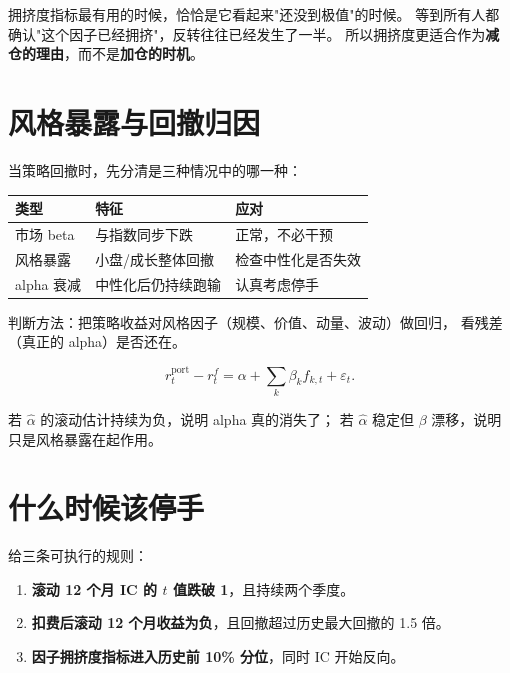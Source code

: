 \begin{warnbox}[拥挤度的悖论]
拥挤度指标最有用的时候，恰恰是它看起来"还没到极值"的时候。
等到所有人都确认"这个因子已经拥挤"，反转往往已经发生了一半。
所以拥挤度更适合作为\textbf{减仓的理由}，而不是\textbf{加仓的时机}。
\end{warnbox}

\section{风格暴露与回撤归因}

当策略回撤时，先分清是三种情况中的哪一种：

\begin{center}
\begin{tabular}{@{}lll@{}}
\toprule
类型 & 特征 & 应对 \\
\midrule
市场 beta & 与指数同步下跌 & 正常，不必干预 \\
风格暴露 & 小盘/成长整体回撤 & 检查中性化是否失效 \\
alpha 衰减 & 中性化后仍持续跑输 & 认真考虑停手 \\
\bottomrule
\end{tabular}
\end{center}

判断方法：把策略收益对风格因子（规模、价值、动量、波动）做回归，
看残差（真正的 alpha）是否还在。

\begin{equation}
  r^{\text{port}}_t - r^f_t = \alpha + \sum_k \beta_k f_{k,t} + \varepsilon_t.
\end{equation}

若 $\hat\alpha$ 的滚动估计持续为负，说明 alpha 真的消失了；
若 $\hat\alpha$ 稳定但 $\beta$ 漂移，说明只是风格暴露在起作用。

\section{什么时候该停手}

给三条可执行的规则：

\begin{enumerate}
  \item \textbf{滚动 12 个月 IC 的 $t$ 值跌破 1}，且持续两个季度。
  \item \textbf{扣费后滚动 12 个月收益为负}，且回撤超过历史最大回撤的 1.5 倍。
  \item \textbf{因子拥挤度指标进入历史前 10\% 分位}，同时 IC 开始反向。
\end{enumerate}

